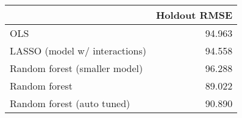 
\begin{tabular}{lr}
\toprule
  & Holdout RMSE\\
\midrule
OLS & 94.963\\
LASSO (model w/ interactions) & 94.558\\
Random forest (smaller model) & 96.288\\
Random forest & 89.022\\
Random forest (auto tuned) & 90.890\\
\bottomrule
\end{tabular}